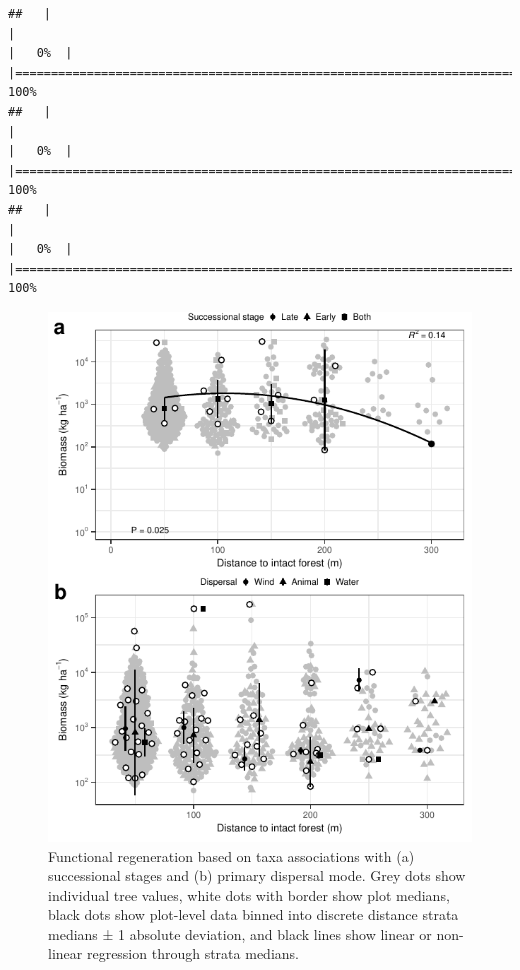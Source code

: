 \documentclass[
  12pt,
]{article}
\begin{document}
\begin{verbatim}
##   |                                                                              |                                                                      |   0%  |                                                                              |======================================================================| 100%
##   |                                                                              |                                                                      |   0%  |                                                                              |======================================================================| 100%
##   |                                                                              |                                                                      |   0%  |                                                                              |======================================================================| 100%
\end{verbatim}

\begin{figure}
\centering
\includegraphics{merge_files/figure-latex/traits-1.pdf}
\caption{\label{fig:traits} Functional regeneration based on taxa associations with (a) successional stages and (b) primary dispersal mode. Grey dots show individual tree values, white dots with border show plot medians, black dots show plot-level data binned into discrete distance strata medians ± 1 absolute deviation, and black lines show linear or non-linear regression through strata medians.}
\end{figure}
\end{document}
